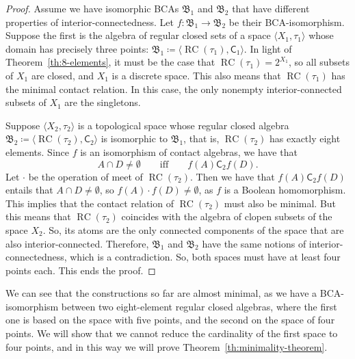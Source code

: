 \documentclass[a4paper,12pt]{amsart}
\numberwithin{equation}{section}
\theoremstyle{mytheoremstyle}
\DeclareMathOperator{\RCvtex}{RC}
\begin{document}
\begin{proof}
Assume we have isomorphic BCAs $\mathfrak{B}_{1}$ and
$\mathfrak{B}_{2}$ that have different properties of interior-connectedness.
Let $f\colon \mathfrak{B}_{1}\to \mathfrak{B}_{2}$ be their BCA-isomorphism.
Suppose the first is the algebra of regular closed sets of a space
$\langle X_{1},\tau _{1}\rangle $ whose domain has precisely three points:
$\mathfrak{B}_{1}\coloneqq   \langle \RCvtex (\tau _{1}),\mathrel{
\mathsf{C}}_{1}  \rangle $. In light of Theorem~\ref{th:8-elements},
it must be the case that $\RCvtex (\tau _{1})=2^{X_{1}}$, so all subsets of
$X_{1}$ are closed, and $X_{1}$ is a discrete space. This also means that
$\RCvtex (\tau _{1})$ has the minimal contact relation. In this case, the only
nonempty interior-connected subsets of $X_{1}$ are the singletons.

Suppose $\langle X_{2},\tau _{2}\rangle $ is a topological space whose
regular closed algebra
$\mathfrak{B}_{2}\coloneqq   \langle \RCvtex (\tau _{2}),\mathord{
\mathrel{\mathsf{C}}_{2}}  \rangle $ is isomorphic to
$\mathfrak{B}_1$, that is, $\RCvtex (\tau _{2})$ has exactly eight elements.
Since $f$ is an isomorphism of contact algebras, we have that
%
\begin{equation*}
A\cap D\neq \emptyset \qquad \text{iff}\qquad f(A)\mathrel{
\mathsf{C}}_{2} f(D).
\end{equation*}
%
Let $\cdot $ be the operation of meet of $\RCvtex (\tau _{2})$. Then we have
that $f(A)\mathrel{\mathsf{C}}_{2} f(D)$ entails that
$A\cap D\neq \emptyset $, so $f(A)\cdot f(D)\neq \emptyset $, as $f$ is
a Boolean homomorphism. This implies that the contact relation of
$\RCvtex (\tau _{2})$ must also be minimal. But this means that
$\RCvtex (\tau _{2})$ coincides with the algebra of clopen subsets of the space
$X_{2}$. So, its atoms are the only connected components of the space that
are also interior-connected. Therefore, $\mathfrak{B}_{1}$ and
$\mathfrak{B}_{2}$ have the same notions of interior-connectedness, which
is a contradiction. So, both spaces must have at least four points each.
This ends the proof.
\end{proof}

\begin{sloppypar}
We can see that the constructions so far are almost minimal, as we have
a BCA-isomorphism between two eight-element regular closed algebras, where
the first one is based on the space with five points, and the second on
the space of four points. We will show that we cannot reduce the cardinality
of the first space to four points, and in this way we will prove Theorem~\ref{th:minimality-theorem}.
\end{sloppypar}
\end{document}
